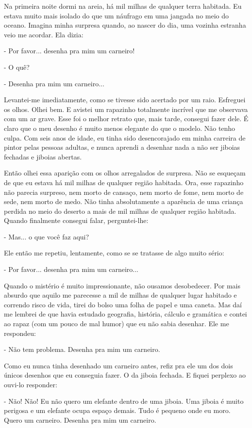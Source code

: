 \begin{Parallel}[p]{}{}
{Na primeira noite dormi na areia, há mil milhas de qualquer terra
habitada. Eu estava muito mais isolado do que um náufrago em uma jangada
no meio do oceano. Imagina minha surpresa quando, ao nascer do dia, uma
vozinha estranha veio me acordar. Ela dizia:

- Por favor... desenha pra mim um carneiro!

- O quê?

- Desenha pra mim um carneiro...

Levantei-me imediatamente, como se tivesse sido acertado por um raio.
Esfreguei os olhos. Olhei bem. E avistei um rapazinho totalmente
incrível que me observava com um ar grave. Esse foi o melhor retrato
que, mais tarde, consegui fazer dele. É claro que o meu desenho é muito
menos elegante do que o modelo. Não tenho culpa. Com seis anos de idade,
eu tinha sido desencorajado em minha carreira de pintor pelas pessoas
adultas, e nunca aprendi a desenhar nada a não ser jiboias fechadas e
jiboias abertas.

Então olhei essa aparição com os olhos arregalados de surpresa. Não se
esqueçam de que eu estava há mil milhas de qualquer região habitada.
Ora, esse rapazinho não parecia surpreso, nem morto de cansaço, nem
morto de fome, nem morto de sede, nem morto de medo. Não tinha
absolutamente a aparência de uma criança perdida no meio do deserto a
mais de mil milhas de qualquer região habitada. Quando finalmente
consegui falar, perguntei-lhe:

- Mas... o que você faz aqui?

Ele então me repetiu, lentamente, como se se tratasse de algo muito
sério:

- Por favor... desenha pra mim um carneiro...

Quando o mistério é muito impressionante, não ousamos desobedecer. Por
mais absurdo que aquilo me parecesse a mil de milhas de qualquer lugar
habitado e correndo risco de vida, tirei do bolso uma folha de papel e
uma caneta. Mas daí me lembrei de que havia estudado geografia,
história, cálculo e gramática e contei ao rapaz (com um pouco de mal
humor) que eu não sabia desenhar. Ele me respondeu:

- Não tem problema. Desenha pra mim um carneiro.

Como eu nunca tinha desenhado um carneiro antes, refiz pra ele um dos
dois únicos desenhos que eu conseguia fazer. O da jiboia fechada. E
fiquei perplexo ao ouvi-lo responder:

- Não! Não! Eu não quero um elefante dentro de uma jiboia. Uma jiboia é
muito perigosa e um elefante ocupa espaço demais. Tudo é pequeno onde eu
moro. Quero um carneiro. Desenha pra mim um carneiro.

}
\end{Parallel}
